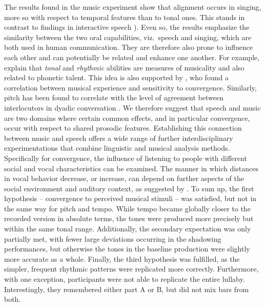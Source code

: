 The results found in the music experiment show that alignment occurs in singing, more so with respect to temporal features than to tonal ones.
This stands in contrast to findings in interactive speech \citep[e.g.,][]{Raveh2019InterspeechAlexa}).
Even so, the results emphasize the similarity between the two oral capabilities, viz.\ speech and singing, which are both used in human communication.
They are therefore also prone to influence each other and can potentially be related and enhance one another.
For example, \citet[][p.\ 216]{Nardo2009musicality} explain that \emph{tonal} and \emph{rhythmic} abilities are measures of musicality and also related to phonetic talent.
This idea is also supported by \citet{Tsang2018musical}, who found a correlation between musical experience and sensitivity to convergence.
Similarly, pitch has been found to correlate with the level of agreement between interlocutors in dyadic conversation \citep{Okada2012interpreting}.
We therefore suggest that speech and music are two domains where certain common effects, and in particular convergence, occur with respect to shared prosodic features.
Establishing this connection between music and speech offers a wide range of further interdisciplinary experimentations that combine linguistic and musical analysis methods.
Specifically for convergence, the influence of listening to people with different social and vocal characteristics can be examined.
The manner in which distances in vocal behavior decrease, or increase, can depend on further aspects of the social environment and auditory context, as suggested by \citet{Noy1999psychoanalysis}.
To sum up, the first hypothesis -- convergence to perceived musical stimuli -- was satisfied, but not in the same way for pitch and tempo.
While tempo became globally closer to the recorded version in absolute terms, the tones were produced more precisely but within the same tonal range.
Additionally, the secondary expectation was only partially met, with fewer large deviations occurring in the shadowing performances, but otherwise the tones in the baseline production were slightly more accurate as a whole.
Finally, the third hypothesis was fulfilled, as the simpler, frequent rhythmic patterns were replicated more correctly.
Furthermore, with one exception, participants were not able to replicate the entire lullaby.
Interestingly, they remembered either part A or B, but did not mix bars from both.

